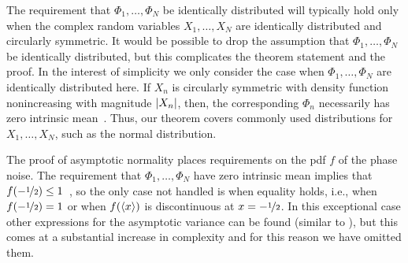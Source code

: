 \documentclass[journal]{IEEEtran}
\begin{document}
The requirement that $\Phi_1, \dots, \Phi_N$ be identically distributed will typically hold only when the complex random variables $X_1, \dots, X_N$ are identically distributed and circularly symmetric.  It would be possible to drop the assumption that $\Phi_1, \dots, \Phi_N$ be identically distributed, but this complicates the theorem statement and the proof.  In the interest of simplicity we only consider the case when $\Phi_1, \dots, \Phi_N$ are identically distributed here.  If $X_n$ is circularly symmetric with density function nonincreasing with magnitude $\left\vert X_n \right\vert$, then, the corresponding $\Phi_n$ necessarily has zero intrinsic mean~\cite[Theorem 5.2, page 78]{McKilliam2010thesis}.  Thus, our theorem covers commonly used distributions for $X_1, \dots, X_N$, such as the normal distribution.

The proof of asymptotic normality places requirements on the pdf $f$ of the phase noise.  The requirement that $\Phi_1, \dots, \Phi_N$ have zero intrinsic mean implies that $f(-\nicefrac{1}{2}) \leq 1$~\cite[Lemma~1]{McKilliam_mean_dir_est_sq_arc_length2010}, so the only case not handled is when equality holds, i.e., when $f(-\nicefrac{1}{2}) = 1$ or when $f(\left\langle x \right\rangle)$ is discontinuous at $x = -\nicefrac{1}{2}$. In this exceptional case other expressions for the asymptotic variance can be found (similar to \cite[Theorem 3.1]{Hotz_circle_means_2011}), but this comes at a substantial increase in complexity and for this reason we have omitted them. %

\end{document}
